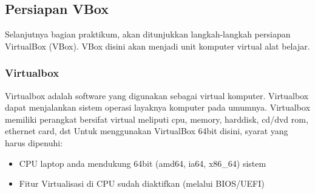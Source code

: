 \documentclass[12pt,]{article}
\begin{document}
	\subsection{Persiapan VBox}
	Selanjutnya bagian praktikum, akan ditunjukkan langkah-langkah persiapan VirtualBox (VBox).
	VBox disini akan menjadi unit komputer virtual alat belajar.

	\subsubsection{Virtualbox}
	Virtualbox adalah software yang digunakan sebagai virtual komputer.
	Virtualbox dapat menjalankan sistem operasi layaknya komputer pada umumnya.
	Virtualbox memiliki perangkat bersifat virtual meliputi cpu, memory, harddisk, cd/dvd rom, ethernet card, dst
	Untuk menggunakan VirtualBox 64bit disini, syarat yang harus dipenuhi:
	\begin{itemize}
		\item CPU laptop anda mendukung 64bit (amd64, ia64, x86\_64) sistem
		\item Fitur Virtualisasi di CPU sudah diaktifkan (melalui BIOS/UEFI)
	\end{itemize}
\end{document}
